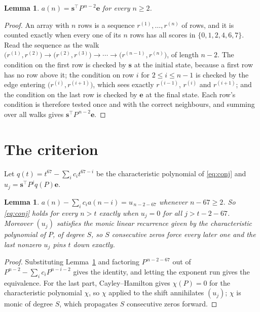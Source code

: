 \documentclass[11pt,a4paper]{article}
\theoremstyle{plain}
\newtheorem{lemma}[theorem]{Lemma}
\theoremstyle{definition}
\begin{document}
\begin{lemma}\label{lem:walk}
$a(n)=\mathbf{s}^{\!\top}P^{\,n-2}\mathbf{e}$ for every $n\ge2$.
\end{lemma}

\begin{proof}
An array with $n$ rows is a sequence $r^{(1)},\dots,r^{(n)}$ of rows, and it is counted
exactly when every one of its $n$ rows has all scores in $\{0,1,2,4,6,7\}$. Read the sequence as the
walk $\bigl(r^{(1)},r^{(2)}\bigr)\to\bigl(r^{(2)},r^{(3)}\bigr)\to\cdots\to
\bigl(r^{(n-1)},r^{(n)}\bigr)$, of length $n-2$. The condition on the first row is
checked by $\mathbf{s}$ at the initial state, because a first row has no row above it; the
condition on row $i$ for $2\le i\le n-1$ is checked by the edge entering
$\bigl(r^{(i)},r^{(i+1)}\bigr)$, which sees exactly $r^{(i-1)}$, $r^{(i)}$ and
$r^{(i+1)}$; and the condition on the last row is checked by $\mathbf{e}$ at the final
state. Each row's condition is therefore tested once and with the correct neighbours, and
summing over all walks gives $\mathbf{s}^{\!\top}P^{\,n-2}\mathbf{e}$.
\end{proof}

\section{The criterion}

Let $q(t)=t^{67}-\sum_i c_i t^{67-i}$ be the characteristic polynomial of
\eqref{eq:conj} and $u_j=\mathbf{s}^{\!\top}P^{j}q(P)\mathbf{e}$.

\begin{lemma}\label{lem:crit}
$a(n)-\sum_i c_i a(n-i)=u_{\,n-2-67}$ whenever $n-67\ge2$. So \eqref{eq:conj}
holds for every $n>t$ exactly when $u_j=0$ for all $j>t-2-67$. Moreover $(u_j)$
satisfies the monic linear recurrence given by the characteristic polynomial of $P$, of
degree $S$, so $S$ consecutive zeros force every later one and the last nonzero $u_j$ pins
$t$ down exactly.
\end{lemma}

\begin{proof}
Substituting Lemma~\ref{lem:walk} and factoring $P^{\,n-2-67}$ out of
$P^{n-2}-\sum_i c_i P^{n-i-2}$ gives the identity, and letting the exponent run gives the
equivalence. For the last part, Cayley--Hamilton gives $\chi(P)=0$ for the characteristic
polynomial $\chi$, so $\chi$ applied to the shift annihilates $(u_j)$; $\chi$ is monic of
degree $S$, which propagates $S$ consecutive zeros forward.
\end{proof}
\end{document}
